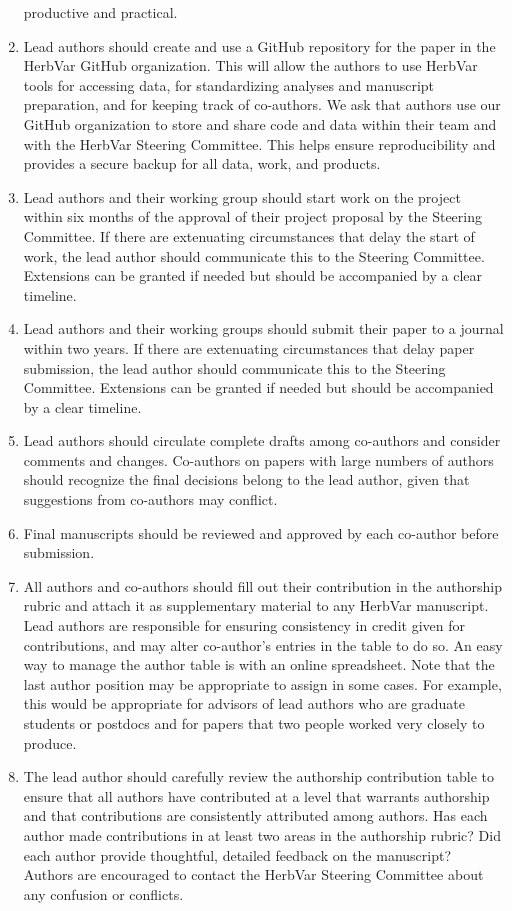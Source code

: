 \documentclass[
  letterpaper,
  oneside,
  open=any]{scrbook}
\begin{document}
\begin{enumerate}
  productive and practical.
\item
  Lead authors should create and use a GitHub repository for the paper
  in the HerbVar GitHub organization. This will allow the authors to use
  HerbVar tools for accessing data, for standardizing analyses and
  manuscript preparation, and for keeping track of co-authors. We ask
  that authors use our GitHub organization to store and share code and
  data within their team and with the HerbVar Steering Committee. This
  helps ensure reproducibility and provides a secure backup for all
  data, work, and products.
\item
  Lead authors and their working group should start work on the project
  within six months of the approval of their project proposal by the
  Steering Committee. If there are extenuating circumstances that delay
  the start of work, the lead author should communicate this to the
  Steering Committee. Extensions can be granted if needed but should be
  accompanied by a clear timeline.
\item
  Lead authors and their working groups should submit their paper to a
  journal within two years. If there are extenuating circumstances that
  delay paper submission, the lead author should communicate this to the
  Steering Committee. Extensions can be granted if needed but should be
  accompanied by a clear timeline.
\item
  Lead authors should circulate complete drafts among co-authors and
  consider comments and changes. Co-authors on papers with large numbers
  of authors should recognize the final decisions belong to the lead
  author, given that suggestions from co-authors may conflict.
\item
  Final manuscripts should be reviewed and approved by each co-author
  before submission.
\item
  All authors and co-authors should fill out their contribution in the
  authorship rubric and attach it as supplementary material to any
  HerbVar manuscript. Lead authors are responsible for ensuring
  consistency in credit given for contributions, and may alter
  co-author's entries in the table to do so. An easy way to manage the
  author table is with an online spreadsheet. Note that the last author
  position may be appropriate to assign in some cases. For example, this
  would be appropriate for advisors of lead authors who are graduate
  students or postdocs and for papers that two people worked very
  closely to produce.
\item
  The lead author should carefully review the authorship contribution
  table to ensure that all authors have contributed at a level that
  warrants authorship and that contributions are consistently attributed
  among authors. Has each author made contributions in at least two
  areas in the authorship rubric? Did each author provide thoughtful,
  detailed feedback on the manuscript? Authors are encouraged to contact
  the HerbVar Steering Committee about any confusion or conflicts.
\end{enumerate}
\end{document}
